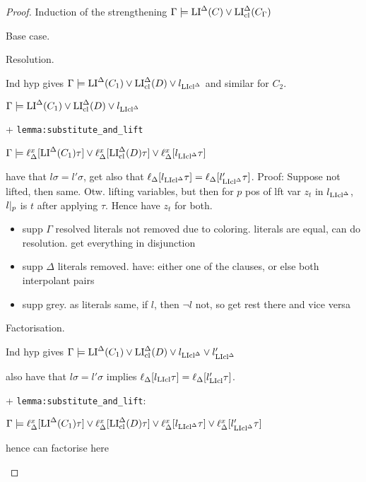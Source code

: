 \documentclass[,%
	draft=false,%
	numbers=noendperiod
	11pt,
	a4paper,
	oneside,%
	openany,
]{memoir}
\begin{document}
\begin{proof}
	Induction of the strengthening $\Gamma\models \operatorname{LI}^\Delta(C) \lor \operatorname{LI}_{\operatorname{cl}}^\Delta(C_\Gamma)$

	\begin{description}
		\item{} Base case.
			\checkmark
		\item{} Resolution.

			Ind hyp gives $\Gamma \models \operatorname{LI}^\Delta(C_1)  \lor \operatorname{LI}_{\operatorname{cl}}^\Delta(D) \lor l_{\operatorname{LIcl}^\Delta} $
			and similar for $C_2$.

			$\Gamma \models \operatorname{LI}^\Delta(C_1)  \lor \operatorname{LI}_{\operatorname{cl}}^\Delta(D) \lor l_{\operatorname{LIcl}^\Delta}$

			+ \texttt{lemma:substitute\_and\_lift}

			$\Gamma \models \ell_{\Delta}^{x}[\operatorname{LI}^\Delta(C_1)\tau]  \lor \ell_{\Delta}^{x}[\operatorname{LI}_{\operatorname{cl}}^\Delta(D)\tau] \lor \ell_{\Delta}^{x}[l_{\operatorname{LIcl}^\Delta}\tau]$


			have that $l\sigma = l'\sigma$, get also that $\ell_{\Delta}[l_{\operatorname{LIcl}^\Delta} \tau] = \ell_{\Delta}[l'_{\operatorname{LIcl}^\Delta} \tau]$. Proof:
			Suppose not lifted, then same. Otw. lifting variables, but then for $p$ pos of lft var $z_t$ in $l_{\operatorname{LIcl}^\Delta}$, $l|_{p}$ is $t$ after applying $\tau$.
			Hence have $z_t$ for both.

			\begin{itemize}
				\item supp $\Gamma$
					resolved literals not removed due to coloring. literals are equal, can do resolution. get everything in disjunction

				\item supp $\Delta$
					literals removed.
					have: either one of the clauses, or else both interpolant pairs

				\item supp grey.
					as literals same, if $l$, then $\lnot l$ not, so get rest there and vice versa

			\end{itemize}

		\item{} Factorisation.

			Ind hyp gives $\Gamma \models \operatorname{LI}^\Delta(C_1)  \lor \operatorname{LI}_{\operatorname{cl}}^\Delta(D) \lor l_{\operatorname{LIcl}^\Delta} \lor l'_{\operatorname{LIcl}^\Delta}$

			also have that $l\sigma = l'\sigma$ implies $\ell_{\Delta}[l_{\operatorname{LIcl}}\tau] = \ell_{\Delta}[l'_{\operatorname{LIcl}}\tau]$.

			+ \texttt{lemma:substitute\_and\_lift}: 

			$\Gamma \models \ell_{\Delta}^{x}[\operatorname{LI}^\Delta(C_1)\tau]  \lor \ell_{\Delta}^{x}[\operatorname{LI}_{\operatorname{cl}}^\Delta(D)\tau] \lor \ell_{\Delta}^{x}[l_{\operatorname{LIcl}^\Delta}\tau] \lor \ell_{\Delta}^{x}[l'_{\operatorname{LIcl}^\Delta}\tau]$

			hence can factorise here
			\qedhere

	\end{description}
\end{proof}
\end{document}
